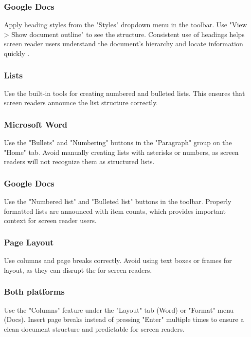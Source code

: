 \subsubsection{Google Docs}\label{ch15:sssec:docs-headings}
Apply heading styles from the "Styles" dropdown menu in the toolbar. Use "View > Show document outline" to see the structure. Consistent use of headings helps screen reader users understand the document's hierarchy and locate information quickly \supercite{GoogleAccessibility}.

\subsubsection{Lists}\label{ch15:sssec:lists}
Use the built-in tools for creating numbered and bulleted lists. This ensures that screen readers announce the list structure correctly.

\subsubsection{Microsoft Word}\label{ch15:sssec:word-lists}
Use the "Bullets" and "Numbering" buttons in the "Paragraph" group on the "Home" tab. Avoid manually creating lists with asterisks or numbers, as screen readers will not recognize them as structured lists.

\subsubsection{Google Docs}\label{ch15:sssec:docs-lists}
Use the "Numbered list" and "Bulleted list" buttons in the toolbar. Properly formatted lists are announced with item counts, which provides important context for screen reader users.

\subsubsection{Page Layout}\label{ch15:sssec:page-layout}
Use columns and page breaks correctly. Avoid using text boxes or frames for layout, as they can disrupt the  for screen readers.

\subsubsection{Both platforms}\label{ch15:sssec:layout-both}
Use the "Columns" feature under the "Layout" tab (Word) or "Format" menu (Docs). Insert page breaks instead of pressing "Enter" multiple times to ensure a clean document structure and predictable  for screen readers.

